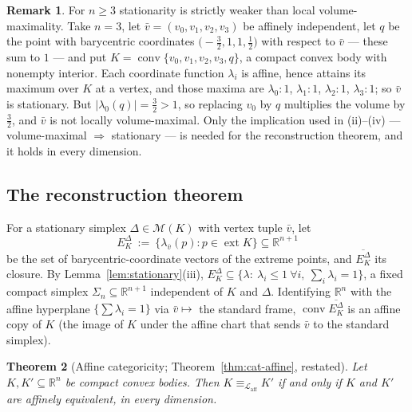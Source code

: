 \documentclass[11pt]{amsart}
\newtheorem{theorem}{Theorem}[section]
\theoremstyle{definition}
\newtheorem{remark}[theorem]{Remark}
\newcommand{\R}{\mathbb{R}}
\newcommand{\Laff}{\mathcal{L}_{\mathrm{aff}}}
\newcommand{\conv}{\operatorname{conv}}
\newcommand{\ext}{\operatorname{ext}}
\begin{document}
\begin{remark}\label{rem:stationary-strict}
For $n\ge3$ stationarity is strictly weaker than local volume-maximality.
Take $n=3$, let $\bar v=(v_0,v_1,v_2,v_3)$ be affinely independent, let $q$
be the point with barycentric coordinates
$\bigl(-\tfrac32,1,1,\tfrac12\bigr)$ with respect to $\bar v$ --- these sum
to $1$ --- and put $K=\conv\{v_0,v_1,v_2,v_3,q\}$, a compact convex body
with nonempty interior. Each coordinate function $\lambda_i$ is affine,
hence attains its maximum over $K$ at a vertex, and those maxima are
$\lambda_0:1$, $\lambda_1:1$, $\lambda_2:1$, $\lambda_3:1$; so $\bar v$ is
stationary. But $|\lambda_0(q)|=\tfrac32>1$, so replacing $v_0$ by $q$
multiplies the volume by $\tfrac32$, and $\bar v$ is not locally
volume-maximal. Only the implication used in (ii)--(iv) --- volume-maximal
$\Rightarrow$ stationary --- is needed for the reconstruction theorem, and
it holds in every dimension.
\end{remark}

\subsection{The reconstruction theorem}

For a stationary simplex $\Delta\in\mathcal M(K)$ with vertex tuple $\bar v$,
let
\[
E_K^{\Delta}\ :=\ \bigl\{\lambda_{\bar v}(p):p\in\ext K\bigr\}\subseteq\R^{n+1}
\]
be the set of barycentric-coordinate vectors of the extreme points, and
$\overline{E_K^{\Delta}}$ its closure. By Lemma~\ref{lem:stationary}(iii),
$E_K^{\Delta}\subseteq\{\lambda:\ \lambda_i\le1\ \forall i,\ \sum_i\lambda_i=1\}$,
a fixed compact simplex $\Sigma_n\subseteq\R^{n+1}$ independent of $K$ and
$\Delta$. Identifying $\R^n$ with the affine hyperplane $\{\sum\lambda_i=1\}$
via $\bar v\mapsto$ the standard frame, $\conv\overline{E_K^{\Delta}}$ is an
affine copy of $K$ (the image of $K$ under the affine chart that sends
$\bar v$ to the standard simplex).

\begin{theorem}[Affine categoricity; Theorem~\ref{thm:cat-affine}, restated]\label{thm:affine-main}
Let $K,K'\subseteq\R^n$ be compact convex bodies. Then $K\equiv_{\Laff}K'$ if
and only if $K$ and $K'$ are affinely equivalent, in every dimension.
\end{theorem}
\end{document}
